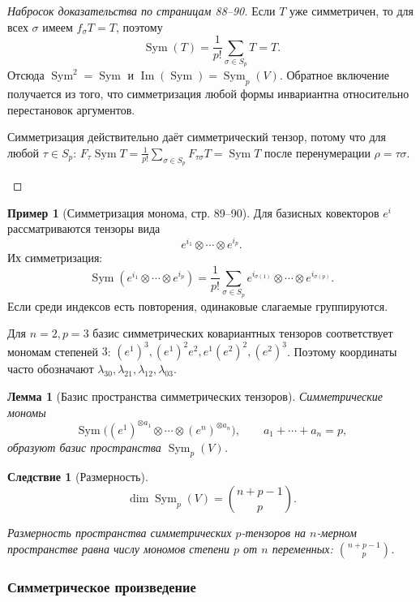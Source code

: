 \documentclass[12pt,a4paper]{article}
\theoremstyle{definition}
\newtheorem{example}[definition]{Пример}
\theoremstyle{plain}
\newtheorem{lemma}[definition]{Лемма}
\newtheorem{corollary}[definition]{Следствие}
\theoremstyle{remark}
\newenvironment{knowledgefix}{\begin{clarifybox}}{\end{clarifybox}}
\newcommand{\Imop}{\operatorname{Im}}
\newcommand{\Sym}{\operatorname{Sym}}
\begin{document}
\begin{proof}[Набросок доказательства по страницам 88--90]
Если $T$ уже симметричен, то для всех $\sigma$ имеем $f_\sigma T=T$, поэтому
\[
    \Sym(T)=\frac{1}{p!}\sum_{\sigma\in S_p}T=T.
\]
Отсюда $\Sym^2=\Sym$ и $\Imop(\Sym)=\Sym_p(V)$.
Обратное включение получается из того, что симметризация любой формы инвариантна относительно перестановок аргументов.
\begin{knowledgefix}
Симметризация действительно даёт симметрический тензор, потому что для любой \(\tau\in S_p\): \(F_\tau\Sym T=\frac1{p!}\sum_{\sigma\in S_p}F_{\tau\sigma}T=\Sym T\) после перенумерации \(\rho=\tau\sigma\).
\end{knowledgefix}
\end{proof}

\begin{example}[Симметризация монома, стр. 89--90]
Для базисных ковекторов $e^i$ рассматриваются тензоры вида
\[
    e^{i_1}\otimes\cdots\otimes e^{i_p}.
\]
Их симметризация:
\[
    \Sym(e^{i_1}\otimes\cdots\otimes e^{i_p})
    =
    \frac{1}{p!}\sum_{\sigma\in S_p}
    e^{i_{\sigma(1)}}\otimes\cdots\otimes e^{i_{\sigma(p)}}.
\]
Если среди индексов есть повторения, одинаковые слагаемые группируются.
\begin{knowledgefix}
Для \(n=2,p=3\) базис симметрических ковариантных тензоров соответствует мономам степеней \(3\): \((e^1)^3,(e^1)^2e^2,e^1(e^2)^2,(e^2)^3\). Поэтому координаты часто обозначают \(\lambda_{30},\lambda_{21},\lambda_{12},\lambda_{03}\).
\end{knowledgefix}
\end{example}

\begin{lemma}[Базис пространства симметрических тензоров]
Симметрические мономы
\[
    \Sym\bigl((e^1)^{\otimes a_1}\otimes\cdots\otimes(e^n)^{\otimes a_n}\bigr),
    \qquad
    a_1+\cdots+a_n=p,
\]
образуют базис пространства $\Sym_p(V)$.
\end{lemma}

\begin{corollary}[Размерность]
\[
    \dim \Sym_p(V)=\binom{n+p-1}{p}.
\]
\begin{knowledgefix}
Размерность пространства симметрических \(p\)-тензоров на \(n\)-мерном пространстве равна числу мономов степени \(p\) от \(n\) переменных: \(\binom{n+p-1}{p}\).
\end{knowledgefix}
\end{corollary}

\subsubsection{Симметрическое произведение}
\end{document}
